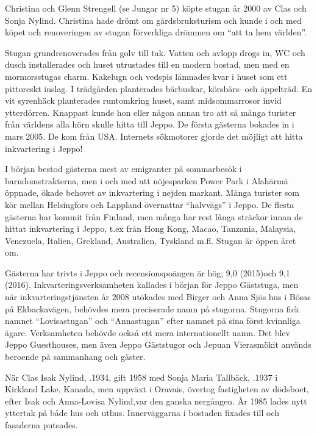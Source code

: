 Christina och Glenn Strengell (se Jungar nr 5) köpte stugan år 2000 av Clas och Sonja Nylind. Christina hade drömt om gårdsbruksturism och kunde i och med köpet och renoveringen av stugan förverkliga drömmen om ``att ta hem världen''.


Stugan grundrenoverades från golv till tak. Vatten och avlopp drogs in, WC och dusch installerades och huset utrustades till en modern bostad, men med en mormorsstugas charm. Kakelugn och vedspis lämnades kvar i huset som ett pittoreskt inslag. I trädgården planterades bärbuskar, körsbärs- och äppelträd. En vit syrenhäck planterades runtomkring huset, samt midsommarrosor invid ytterdörren. Knappast kunde hon eller någon annan tro att så många turister från världens alla hörn skulle hitta till Jeppo. De första gästerna bokades in i mars 2005. De kom från USA. Internets sökmotorer gjorde det möjligt att hitta inkvartering i Jeppo!

I början bestod gästerna mest av emigranter på sommarbesök i barndomstrakterna, men i och med att nöjesparken Power Park i Alahärmä öppnade, ökade behovet av inkvartering i nejden markant. Många turister som kör mellan Helsingfors och Lappland övernattar ``halvvägs'' i Jeppo. De flesta gästerna har kommit från Finland, men många har rest långa sträckor innan de hittat inkvartering i Jeppo, t.ex från Hong Kong, Macao, Tanzania, Malaysia, Venezuela, Italien, Grekland, Australien, Tyskland m.fl. Stugan är öppen året om.

Gästerna har trivts i Jeppo och recensionspoängen är hög; 9,0 (2015)och 9,1 (2016). Inkvarteringsverksamheten kallades i början för Jeppo Gäststuga, men när inkvarteringstjänsten år 2008 utökades med Birger och Anna Sjös hus i Bösas på Ekbackavägen, behövdes mera preciserade namn på stugorna. Stugorna fick namnet ``Lovisastugan'' och ``Annastugan'' efter namnet på sina först kvinnliga ägare. Verksamheten behövde också ett mera internationellt namn. Det blev Jeppo Guesthouses, men även Jeppo Gäststugor och Jepuan Vierasmökit används beroende på sammanhang och gäster.


När Clas Isak Nylind, .1934, gift 1958 med Sonja Maria Tallbäck, .1937 i Kirkland Lake, Kanada, men uppväxt i Oravais, övertog fastigheten av dödsboet, efter Isak och Anna-Lovisa Nylind,var den ganska nergången. År 1985 lades nytt yttertak på både hus och uthus. Innerväggarna i bostaden fixades till och fasaderna putsades.

